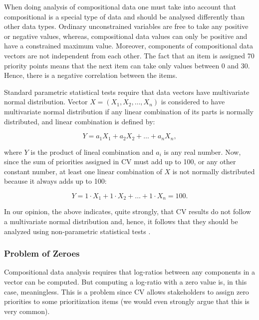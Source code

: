 
When doing analysis of compositional data one must take into account that compositional is a special type of data and should be analysed differently than other data types.
Ordinary unconstrained variables are free to take any positive or negative values,
whereas, compositional data values can only be positive and have a constrained maximum value.
Moreover, components of compositional data vectors are not independent from each other.
The fact that an item is assigned 70 priority points means that the next item can take only values between 0 and 30.
Hence, there is a negative correlation between the items.

Standard parametric statistical tests require that data vectors have multivariate normal distribution.
Vector $X=(X_{1}, X_{2}, \ldots, X_{n})$
is considered to have multivariate normal distribution if any linear
combination of its parts is normally distributed, and linear combination
is defined by:

\begin{equation}
	Y=a_{1}X_{1}+a_{2}X_{2}+\ldots+a_{n}X_{n},
\end{equation}

where $Y$ is the product of lineal combination and $a_{i}$ is any
real number. Now, since the sum of priorities assigned in CV must add up
to 100, or any other constant number, at least one linear combination
of $X$ is not normally distributed because it always adds up to
100:

\begin{equation}
	Y=1\cdot X_{1}+1\cdot X_{2}+\ldots+1\cdot X_{n}=100.
\end{equation}

In our opinion, the above indicates, quite strongly, that CV results do not follow a multivariate normal distribution and, hence, it follows that they should be analyzed using non-parametric statistical tests \cite{Pawlowsky-Glahn2006}.

\subsubsection{\label{Problem-of-Zeroes}Problem of Zeroes}
Compositional data analysis requires that log-ratios between any components in a vector can be
computed. But computing a log-ratio with a zero value is, in this case, meaningless. This is
a problem since CV allows stakeholders to assign zero priorities
to some prioritization items (we would even strongly argue that this is very common). 

